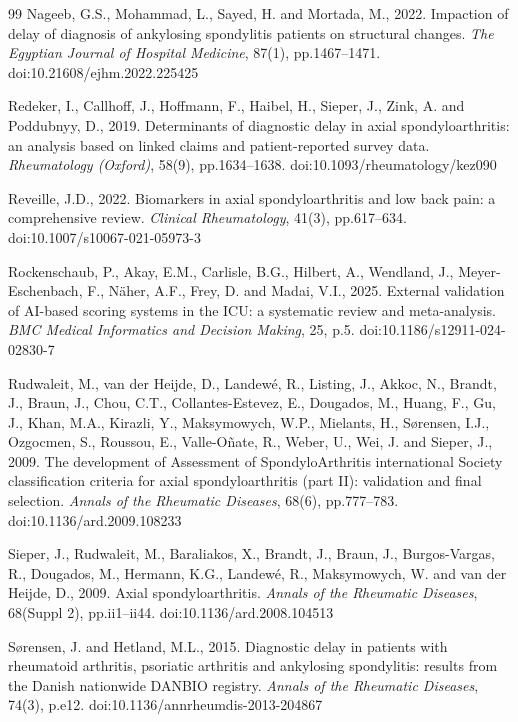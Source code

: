 \documentclass[12pt, a4paper]{article}
\begin{document}
\begin{thebibliography}{99}
Nageeb, G.S., Mohammad, L., Sayed, H. and Mortada, M., 2022. Impaction of delay of diagnosis of ankylosing spondylitis patients on structural changes. \textit{The Egyptian Journal of Hospital Medicine}, 87(1), pp.1467--1471. doi:10.21608/ejhm.2022.225425

Redeker, I., Callhoff, J., Hoffmann, F., Haibel, H., Sieper, J., Zink, A. and Poddubnyy, D., 2019. Determinants of diagnostic delay in axial spondyloarthritis: an analysis based on linked claims and patient-reported survey data. \textit{Rheumatology (Oxford)}, 58(9), pp.1634--1638. doi:10.1093/rheumatology/kez090

Reveille, J.D., 2022. Biomarkers in axial spondyloarthritis and low back pain: a comprehensive review. \textit{Clinical Rheumatology}, 41(3), pp.617--634. doi:10.1007/s10067-021-05973-3

Rockenschaub, P., Akay, E.M., Carlisle, B.G., Hilbert, A., Wendland, J., Meyer-Eschenbach, F., Näher, A.F., Frey, D. and Madai, V.I., 2025. External validation of AI-based scoring systems in the ICU: a systematic review and meta-analysis. \textit{BMC Medical Informatics and Decision Making}, 25, p.5. doi:10.1186/s12911-024-02830-7


Rudwaleit, M., van der Heijde, D., Landewé, R., Listing, J., Akkoc, N., Brandt, J., Braun, J., Chou, C.T., Collantes-Estevez, E., Dougados, M., Huang, F., Gu, J., Khan, M.A., Kirazli, Y., Maksymowych, W.P., Mielants, H., Sørensen, I.J., Ozgocmen, S., Roussou, E., Valle-Oñate, R., Weber, U., Wei, J. and Sieper, J., 2009. The development of Assessment of SpondyloArthritis international Society classification criteria for axial spondyloarthritis (part II): validation and final selection. \textit{Annals of the Rheumatic Diseases}, 68(6), pp.777--783. doi:10.1136/ard.2009.108233

Sieper, J., Rudwaleit, M., Baraliakos, X., Brandt, J., Braun, J., Burgos-Vargas, R., Dougados, M., Hermann, K.G., Landewé, R., Maksymowych, W. and van der Heijde, D., 2009. Axial spondyloarthritis. \textit{Annals of the Rheumatic Diseases}, 68(Suppl 2), pp.ii1--ii44. doi:10.1136/ard.2008.104513

Sørensen, J. and Hetland, M.L., 2015. Diagnostic delay in patients with rheumatoid arthritis, psoriatic arthritis and ankylosing spondylitis: results from the Danish nationwide DANBIO registry. \textit{Annals of the Rheumatic Diseases}, 74(3), p.e12. doi:10.1136/annrheumdis-2013-204867


\end{thebibliography}
\end{document}
